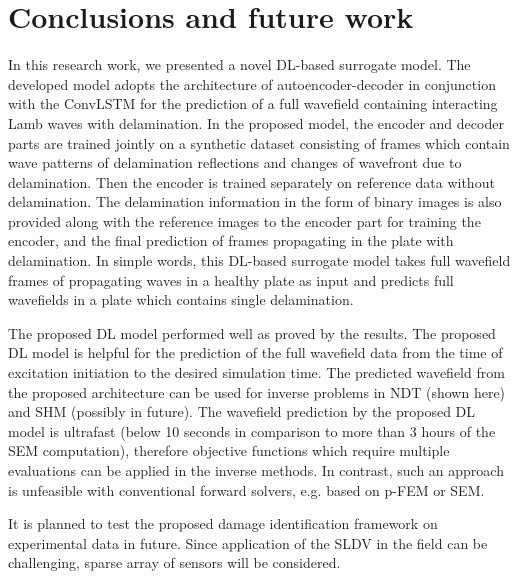 \section{Conclusions and future work}
\label{conclusion}
In this research work, we presented a novel DL-based surrogate model. 
The developed model adopts the architecture of autoencoder-decoder in conjunction with the ConvLSTM for the prediction of a full wavefield containing interacting Lamb waves with delamination. 
In the proposed model, the encoder and decoder parts are trained jointly on a synthetic dataset consisting of frames which contain wave patterns of delamination reflections and changes of wavefront due to delamination. 
Then the encoder is trained separately on reference data without delamination. 
The delamination information in the form of binary images is also provided along with the reference images to the encoder part for training the encoder, and the final prediction of frames propagating in the plate with delamination.
In simple words, this DL-based surrogate model takes full wavefield frames of propagating waves in a healthy plate as input and predicts full wavefields in a plate which contains single delamination.

The proposed DL model performed well as proved by the results.
The proposed DL model is helpful for the prediction of the full wavefield data from the time of excitation initiation to the desired simulation time. 
The predicted wavefield from the proposed architecture can be used for inverse problems in NDT (shown here) and SHM (possibly in future).
The wavefield prediction by the proposed DL model is ultrafast (below 10 seconds in comparison to more than 3 hours of the SEM computation), therefore objective functions which require multiple evaluations can be applied in the inverse methods.
In contrast, such an approach is unfeasible with conventional forward solvers, e.g. based on p-FEM or SEM. 

It is planned to test the proposed damage identification framework on experimental data in future.
Since application of the SLDV in the field can be challenging, sparse array of sensors will be considered.